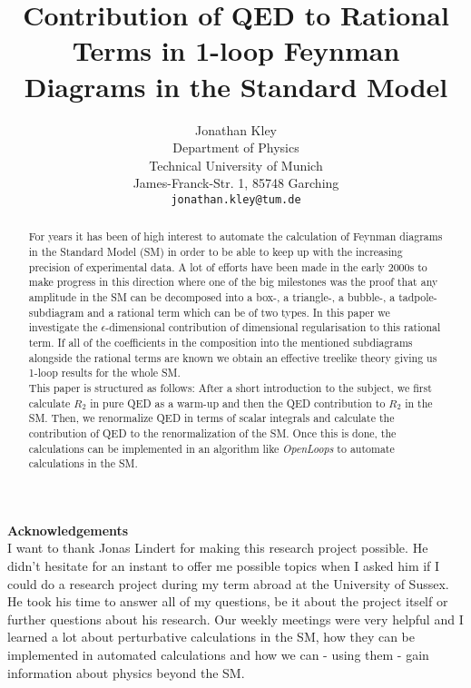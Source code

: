 \documentclass{article}
\title{Contribution of QED to Rational Terms in 1-loop Feynman Diagrams in the Standard Model}
\author{
  Jonathan Kley \\
  Department of Physics\\
  Technical University of Munich\\
  James-Franck-Str. 1, 85748 Garching \\
  \texttt{jonathan.kley@tum.de} \\
}
\numberwithin{equation}{section} %
\begin{document}
\maketitle

\begin{abstract}
For years it has been of high interest to automate the calculation of Feynman diagrams in the Standard Model (SM) in order to be able to keep up with the increasing precision of experimental data. A lot of efforts have been made in the early 2000s to make progress in this direction where one of the big milestones was the proof that any amplitude in the SM can be decomposed into a box-, a triangle-, a bubble-, a tadpole-subdiagram and a rational term which can be of two types. In this paper we investigate the $\epsilon$-dimensional contribution of dimensional regularisation to this rational term. If all of the coefficients in the composition into the mentioned subdiagrams alongside the rational terms are known we obtain an effective treelike theory giving us 1-loop results for the whole SM. \\
This paper is structured as follows: After a short introduction to the subject, we first calculate $R_2$ in pure QED as a warm-up and then the QED contribution to $R_2$ in the SM. Then, we renormalize QED in terms of scalar integrals and calculate the contribution of QED to the renormalization of the SM. Once this is done, the calculations can be implemented in an algorithm like \textit{OpenLoops} to automate calculations in the SM.\end{abstract}



\newpage
\tableofcontents
\newpage





{\bf\Large Acknowledgements} \\

I want to thank Jonas Lindert for making this research project possible. He didn't hesitate for an instant to offer me possible topics when I asked him if I could do a research project during my term abroad at the University of Sussex. He took his time to answer all of my questions, be it about the project itself or further questions about his research. Our weekly meetings were very helpful and I learned a lot about perturbative calculations in the SM, how they can be implemented in automated calculations and how we can - using them - gain information about physics beyond the SM.



  

\end{document}
